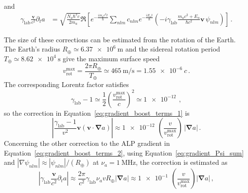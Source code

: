 and
\begin{align}
    \gamma_\mathrm{lab}\frac{\boldsymbol{v}}{c^2}\partial_t a
    &=
    \sqrt{\frac{N_a \hbar^3 c}{2 m_a}}
    \Re\left[
    e^{-\frac{i m_a c^2 t}{\hbar}}
    \sum_{nlm} c_{nlm}e^{-\frac{i E_n t}{\hbar}}
    \left(
    -i\gamma_\mathrm{lab}\frac{m_a c^2+E_n}{\hbar c^2}
    \boldsymbol{v}\,\psi_{nlm}
    \right)
    \right]
    \,.\label{eq:gradient_boost_terms_2}
\end{align}

The size of these corrections can be estimated from the rotation of the Earth.
The Earth's radius $R_\oplus\simeq\SI{6.37e6}{\meter}$ and the sidereal rotation period $T_\oplus\simeq\SI{8.62e4}{\second}$ give the maximum surface speed\,\cite{Zhang2026_Dissertation_ipynb_2_theory_EH_ALP}
\begin{equation}
    v_\mathrm{rot}^{\max}
    =
    \frac{2\pi R_\oplus}{T_\oplus}
    \simeq\SI{465}{\meter\per\second}
    =\SI{1.55e-6}{c}
    \,.
\end{equation}
The corresponding Lorentz factor satisfies
\begin{equation}
    \gamma_\mathrm{lab}-1
    \simeq
    \frac{1}{2}\left(\frac{v_\mathrm{rot}^{\max}}{c}\right)^2
    \simeq \SI{1e-12}{}
    \,,
\end{equation}
so the correction in Equation~\eqref{eq:gradient_boost_terms_1} is\,\cite{Zhang2026_Dissertation_ipynb_2_theory_EH_ALP}
\begin{equation}
    \left|\frac{\gamma_\mathrm{lab}-1}{v^2}\boldsymbol{v}
    \left(\boldsymbol{v}\cdot\boldsymbol{\nabla}a\right)\right|
    \approx
    \SI{1e-12}{}\,
    \left( \frac{v}{v_\mathrm{rot}^{\max}} \right)
    \,\left| \boldsymbol{\nabla}a \right|
    \,.
\end{equation}
Concerning the other correction to the ALP gradient in Equation~\eqref{eq:gradient_boost_terms_2}, using Equation~\eqref{eq:gradient_Psi_sum} and $|\nabla\psi_{nlm}|\approx |\psi_{nlm}|/(R_\oplus)$ at $\nu_a=\SI{1}{\MHz}$, the correction is estimated as\,\cite{Zhang2026_Dissertation_ipynb_2_theory_EH_ALP}
\begin{equation}
    \left|\gamma_\mathrm{lab}\frac{\boldsymbol{v}}{c^2}\partial_t a\right| \approx \frac{2\pi}{c^2} \gamma_\mathrm{lab} \nu_a v R_\oplus \left| \boldsymbol{\nabla}a \right| \approx
    \SI{1e-1}{}\,
    \left( \frac{v}{v_\mathrm{rot}^{\max}} \right)
    \left| \boldsymbol{\nabla}a \right|
    \,,
\end{equation}

